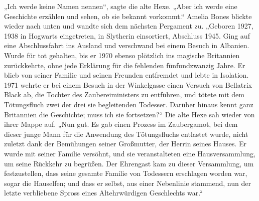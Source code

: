 „Ich werde keine Namen nennen“, sagte die alte Hexe.
„Aber ich werde eine Geschichte erzählen und sehen, ob sie bekannt vorkommt.“
Amelia Bones blickte wieder nach unten und wandte sich dem nächsten Pergament zu.
„Geboren 1927, 1938 in Hogwarts eingetreten, in Slytherin einsortiert, Abschluss 1945. Ging auf eine Abschlussfahrt ins Ausland und verschwand bei einem Besuch in Albanien. Wurde für tot gehalten, bis er 1970 ebenso plötzlich ins magische Britannien zurückkehrte, ohne jede Erklärung für die fehlenden fünfundzwanzig Jahre. Er blieb von seiner Familie und seinen Freunden entfremdet und lebte in Isolation. 1971 wehrte er bei einem Besuch in der Winkelgasse einen Versuch von Bellatrix Black ab, die Tochter des Zaubereiministers zu entführen, und tötete mit dem Tötungsfluch zwei der drei sie begleitenden Todesser. Darüber hinaus kennt ganz Britannien die Geschichte; muss ich sie fortsetzen?“
Die alte Hexe sah wieder von ihrer Mappe auf.
„Nun gut. Es gab einen Prozess im Zaubergamot, bei dem dieser junge Mann für die Anwendung des Tötungsfluchs entlastet wurde, nicht zuletzt dank der Bemühungen seiner Großmutter, der Herrin seines Hauses. Er wurde mit seiner Familie versöhnt, und sie veranstalteten eine Hausversammlung, um seine Rückkehr zu begrüßen. Der Ehrengast kam zu dieser Versammlung, um festzustellen, dass seine gesamte Familie von Todessern erschlagen worden war, sogar die Hauselfen; und dass er selbst, aus einer Nebenlinie stammend, nun der letzte verbliebene Spross eines Altehrwürdigen Geschlechts war.“

